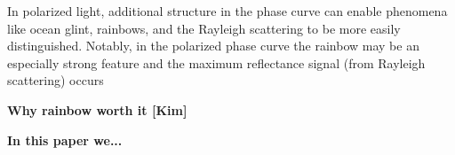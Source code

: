 \documentclass[
    usenatbib,
]{mnras}
\begin{document}
 In polarized light, additional structure in the phase curve can enable phenomena like ocean glint, rainbows, and the Rayleigh scattering to be more easily distinguished.  Notably, in the polarized phase curve the rainbow may be an especially strong feature and the maximum reflectance signal (from Rayleigh scattering) occurs 

 



\textbf{Why rainbow worth it [Kim]} %




\textbf{In this paper we...}






 
\end{document}
